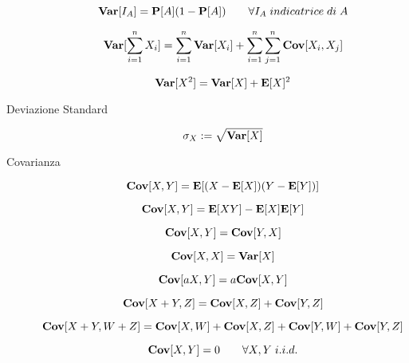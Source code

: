 \begin{description}
		\begin{equation}
		\mathbf{Var}[I_{A}] = \mathbf{P}[A](1-\mathbf{P}[A]) \qquad\forall I_{A} \; indicatrice \; di \; A
		\end{equation}
		
		\begin{equation}
		\mathbf{Var}[\sum_{i=1}^{n}X_{i}] = \sum_{i=1}^{n}\mathbf{Var}[X_{i}] + \sum_{i=1}^{n}\sum_{j=1}^{n}\mathbf{Cov}[X_{i},X_{j}]
		\end{equation}
		
		\begin{equation}
		\mathbf{Var}[X^{2}] = \mathbf{Var}[X]+\mathbf{E}[X]^{2}
		\end{equation}
	
	\item [Deviazione Standard]
		\begin{equation}
		\sigma_{X} := \sqrt{\mathbf{Var}[X]}
		\end{equation}
	
	\item [Covarianza]
		\begin{equation}
		\mathbf{Cov}[X,Y] = \mathbf{E}[(X-\mathbf{E}[X])(Y-\mathbf{E}[Y])]
		\end{equation}
		
		\begin{equation}
		\mathbf{Cov}[X,Y] = \mathbf{E}[XY]-\mathbf{E}[X]\mathbf{E}[Y]
		\end{equation}
		
		\begin{equation}
		\mathbf{Cov}[X,Y] = \mathbf{Cov}[Y,X]
		\end{equation}
		
		\begin{equation}
		\mathbf{Cov}[X,X] = \mathbf{Var}[X]
		\end{equation}
		
		\begin{equation}
		\mathbf{Cov}[aX,Y] = a\mathbf{Cov}[X,Y]
		\end{equation}
		
		\begin{equation}
		\mathbf{Cov}[X+Y,Z] = \mathbf{Cov}[X,Z]+\mathbf{Cov}[Y,Z]
		\end{equation}
		
		\begin{equation}
		\mathbf{Cov}[X+Y,W+Z] = \mathbf{Cov}[X,W]+\mathbf{Cov}[X,Z]+\mathbf{Cov}[Y,W]+\mathbf{Cov}[Y,Z]
		\end{equation}
		
		\begin{equation}
		\mathbf{Cov}[X,Y] = 0 \qquad\forall X,Y \; i.i.d.
		\end{equation}
		

\end{description}
